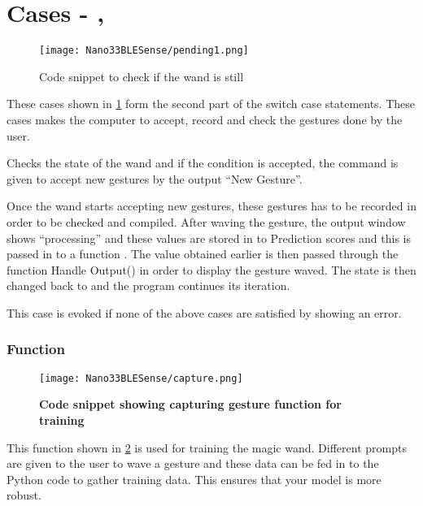 \section{Cases - , } 

\begin{figure}[h!]
    \texttt{[image: Nano33BLESense/pending1.png]}
    \caption{Code snippet to check if the wand is still}
    \label{pending1}
\end{figure}


These cases shown in \ref{pending1} form the second part of the switch case statements. These cases makes the computer to accept, record and check the gestures done by the user. 

\bigskip


Checks the state of the wand and if the condition is accepted, the command is given to accept new gestures by the output ``New Gesture''.

\bigskip


Once the wand starts accepting new gestures, these gestures has to be recorded in order to be checked and compiled.  After waving the gesture, the output window shows ``processing'' and these values are stored in to Prediction scores and this is  passed in to a  function . The value obtained earlier is then passed through the function Handle Output() in order to display the gesture waved. The state is then changed back to  and the program continues its iteration.

\bigskip


This case is evoked if none of the above cases are satisfied by showing an error. 

\subsubsection{Function }

\begin{figure}[h!]
    \texttt{[image: Nano33BLESense/capture.png]}
    \caption{\textbf{Code snippet showing capturing gesture function for training}}
    \label{capture}
\end{figure}

This function  shown in \ref{capture} is used for training the magic wand. Different prompts are given to the user to wave a gesture and these data can be fed in to the Python code to gather training data. This ensures that your model is more robust.

